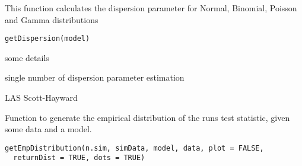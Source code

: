 \documentclass[a4paper]{book}
\begin{document}
%
\begin{Description}\relax
This function calculates the dispersion parameter for Normal, Binomial, Poisson and Gamma distributions
\end{Description}
%
\begin{Usage}
\begin{verbatim}
getDispersion(model)
\end{verbatim}
\end{Usage}
%
\begin{Arguments}
\begin{ldescription}
\item[\code{model}] 
\end{ldescription}
\end{Arguments}
%
\begin{Details}\relax
some details
\end{Details}
%
\begin{Value}
single number of dispersion parameter estimation
\end{Value}
%
\begin{Author}\relax
LAS Scott-Hayward
\end{Author}
%
\begin{Description}\relax
Function to generate the empirical distribution of the runs test statistic, given some data and a model.
\end{Description}
%
\begin{Usage}
\begin{verbatim}
getEmpDistribution(n.sim, simData, model, data, plot = FALSE,
  returnDist = TRUE, dots = TRUE)
\end{verbatim}
\end{Usage}
%
\end{document}
